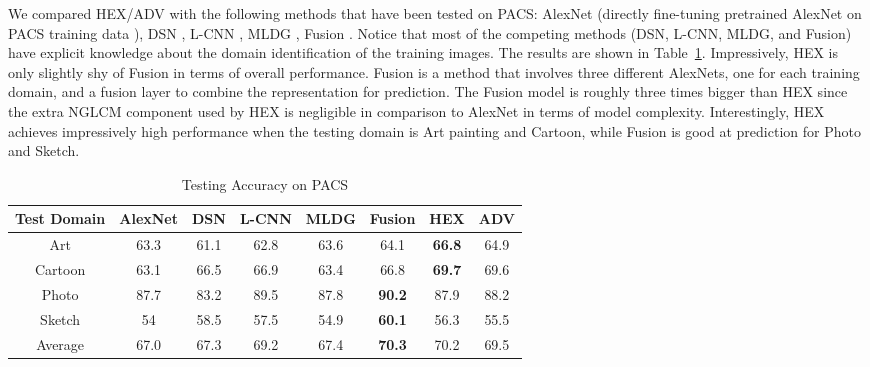 We compared HEX/ADV with the following methods that have been tested on PACS: AlexNet (directly fine-tuning pretrained AlexNet on PACS training data \citep{li2017deeper}), DSN \citep{bousmalis2016domain}, L-CNN \citep{li2017deeper}, MLDG \citep{li2017learning}, Fusion \citep{mancini2018best}. Notice that most of the competing methods (DSN, L-CNN, MLDG, and Fusion) have explicit knowledge about the domain identification of the training images. The results are shown in Table~\ref{tab:pacs}. Impressively, HEX is only slightly shy of Fusion in terms of overall performance. Fusion is a method that involves three different AlexNets, one for each training domain, and a fusion layer to combine the representation for prediction. The Fusion model is roughly three times bigger than HEX since the extra NGLCM component used by HEX is negligible in comparison to AlexNet in terms of model complexity. Interestingly, HEX achieves impressively high performance when the testing domain is Art painting and Cartoon, while Fusion is good at prediction for Photo and Sketch. 
\begin{table}[]
\centering
\begin{tabular}{cccccccc}
\hline
Test Domain & AlexNet & DSN & L-CNN & MLDG & Fusion & HEX & ADV\\ \hline
Art & 63.3 & 61.1 & 62.8 & 63.6 & 64.1 & \textbf{66.8} & 64.9 \\
Cartoon & 63.1 & 66.5 & 66.9 & 63.4 & 66.8 & \textbf{69.7} & 69.6 \\
Photo & 87.7 & 83.2 & 89.5 & 87.8 & \textbf{90.2} & 87.9 & 88.2\\
Sketch & 54 & 58.5 & 57.5 & 54.9 & \textbf{60.1} & 56.3 & 55.5\\ \hline
Average & 67.0 & 67.3 & 69.2 & 67.4 & \textbf{70.3} & 70.2 & 69.5\\ \hline
\end{tabular}
\caption{Testing Accuracy on PACS}
\label{tab:pacs}
\end{table}